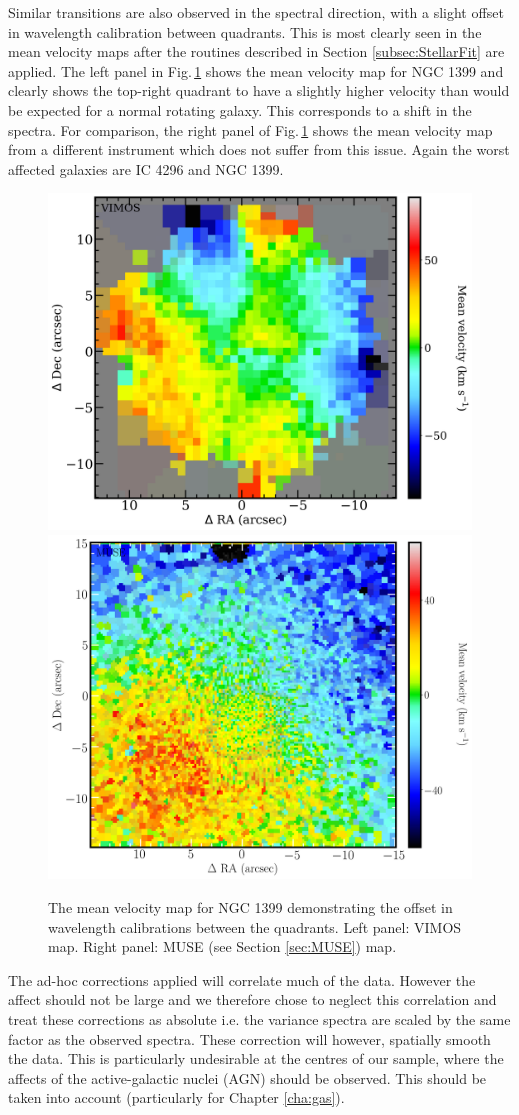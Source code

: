 		Similar transitions are also observed in the spectral direction, with a slight offset in wavelength calibration between quadrants. This is most clearly seen in the mean velocity maps after the routines described in Section \ref{subsec:StellarFit} are applied. The left panel in Fig.\,\ref{fig:egVel} shows the mean velocity map for NGC 1399 and clearly shows the top-right quadrant to have a slightly higher velocity than would be expected for a normal rotating galaxy. This corresponds to a shift in the spectra. For comparison, the right panel of Fig.\,\ref{fig:egVel} shows the mean velocity map from a different instrument which does not suffer from this issue. Again the worst affected galaxies are IC 4296 and NGC 1399.

		\begin{figure}
			\centering
			\includegraphics[width=.4\textwidth]{chapter2/VIMOS_NGC1399_vel.png}
			\includegraphics[width=.4\textwidth]{chapter2/MUSE_NGC1399_vel.png}
			\caption[Issues with wavelength calibrations in VIMOS data]{The mean velocity map for NGC 1399 demonstrating the offset in wavelength calibrations between the quadrants. Left panel: VIMOS map. Right panel: MUSE (see Section \ref{sec:MUSE}) map.}
			\label{fig:egVel}
		\end{figure}

		The ad-hoc corrections applied will correlate much of the data. However the affect should not be large and we therefore chose to neglect this correlation and treat these corrections as absolute i.e. the variance spectra are scaled by the same factor as the observed spectra. These correction will however, spatially smooth the data. This is particularly undesirable at the centres of our sample, where the affects of the active-galactic nuclei (AGN) should be observed. This should be taken into account (particularly for Chapter \ref{cha:gas}).



